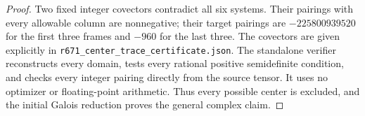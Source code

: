 \begin{proof}
Two fixed integer covectors contradict all six systems. Their
pairings with every allowable column are nonnegative; their target
pairings are $-225800939520$ for the first three frames and $-960$
for the last three. The covectors are given explicitly in
\texttt{r671\_center\_trace\_certificate.json}.
The standalone verifier reconstructs every domain, tests every
rational positive semidefinite condition, and checks every integer
pairing directly from the source tensor. It uses no optimizer or
floating-point arithmetic. Thus every possible center is excluded,
and the initial Galois reduction proves the general complex claim.
\end{proof}
